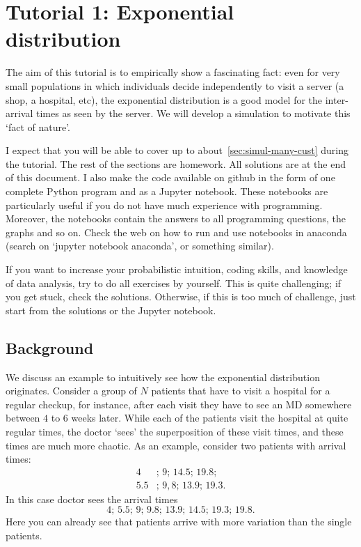 \section{Tutorial 1: Exponential distribution}

The aim of this tutorial is to empirically show a fascinating fact: even for very small populations in which individuals decide independently to visit a server (a shop, a hospital, etc), the exponential distribution is a good model for the inter-arrival times as seen by the server.
We will develop a simulation to motivate this `fact of nature'.

I expect that you will be able to cover up to about~\cref{sec:simul-many-cust} during the tutorial.
The rest of the sections are homework.
All solutions are at the end of this document.
I also make the code available on github in the form of one complete Python program and as a Jupyter notebook.
These notebooks are particularly useful if you do not have much experience with programming.
Moreover, the notebooks contain the answers to all programming questions, the graphs and so on.
Check the web on how to run and use notebooks in anaconda (search on `jupyter notebook anaconda', or something similar).

If you want to increase your probabilistic intuition, coding skills, and knowledge of data analysis, try to do all exercises by yourself.
This is quite challenging; if you get stuck, check the solutions.
Otherwise, if this is too much of challenge, just start from the solutions or the Jupyter notebook.

\subsection{Background}

We discuss an example to intuitively see how the exponential distribution originates.
Consider a group of $N$ patients that have to visit a hospital for a regular checkup, for instance, after each visit they have to see an MD somewhere between $4$ to $6$ weeks later.
While each of the patients visit the hospital at quite regular times, the doctor `sees' the superposition of these visit times, and these times are much more chaotic.
As an example, consider two patients with arrival times:
\begin{align*}
  4&;\, 9;\, 14.5;\, 19.8; \\   
  5.5&;\, 9,8;\, 13.9;\, 19.3.
\end{align*}
In this case doctor sees the arrival times
\begin{equation*}
4;\, 5.5;\, 9;\, 9.8;\, 13.9;\, 14.5;\, 19.3;\, 19.8.
\end{equation*}
Here you can already see that patients arrive with more variation than the single patients.

